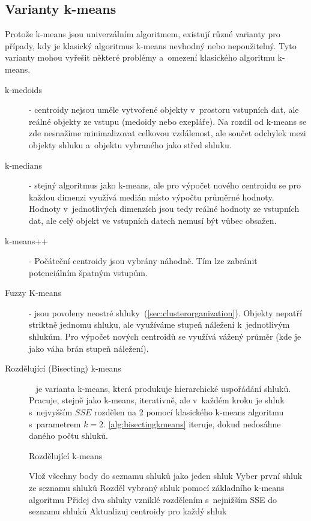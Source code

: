 \subsection{Varianty k-means}
Protože k-means jsou univerzálním algoritmem, existují různé varianty pro případy, kdy je klasický algoritmus k-means nevhodný nebo nepoužitelný. Tyto varianty mohou vyřešit některé problémy a~omezení klasického algoritmu k-means.
\begin{description}
\item[k-medoids] - centroidy nejsou uměle vytvořené objekty v~prostoru vstupních dat, ale reálné objekty ze vstupu (medoidy nebo exepláře). Na rozdíl od k-means se zde nesnažíme minimalizovat celkovou vzdálenost, ale součet odchylek mezi objekty shluku a~objektu vybraného jako střed shluku.
\item[k-medians] - stejný algoritmus jako k-means, ale pro výpočet nového centroidu se pro každou dimenzi využívá medián místo výpočtu průměrné hodnoty. Hodnoty v~jednotlivých dimenzích jsou tedy reálné hodnoty ze vstupních dat, ale celý objekt ve vstupních datech nemusí být vůbec obsažen.
\item[k-means++] - Počáteční centroidy jsou vybrány náhodně. Tím lze zabránit potenciálním špatným vstupům.
\item[Fuzzy K-means] - jsou povoleny neostré shluky~(\autoref{sec:clusterorganization}). Objekty nepatří striktně jednomu shluku, ale využíváme stupeň náležení k~jednotlivým shlukům. Pro výpočet nových centroidů se využívá vážený průměr (kde je jako váha brán stupeň náležení).
\item[Rozdělující (Bisecting) k-means]~\cite{Tan05} je varianta k-means, která produkuje hierarchické uspořádání shluků. Pracuje, stejně jako k-means, iterativně, ale v~každém kroku je shluk s~nejvyšším $SSE$ rozdělen na 2 pomocí klasického k-means algoritmu s~parametrem $k=2$. \autoref{alg:bisectingkmeans} iteruje, dokud nedosáhne daného počtu shluků.
\begin{algorithm}
\caption{Rozdělující k-means}\label{alg:bisectingkmeans}
\begin{algorithmic}[1]
\State Vlož všechny body do seznamu shluků jako jeden shluk
\Repeat
\State Vyber první shluk ze seznamu shluků
\State Rozděl vybraný shluk pomocí základního k-means algoritmu
\EndFor
\State Přidej dva shluky vzniklé rozdělením s~nejnižším SSE do seznamu shluků
\State Aktualizuj centroidy pro každý shluk
\end{algorithmic}
\end{algorithm}

\end{description}

